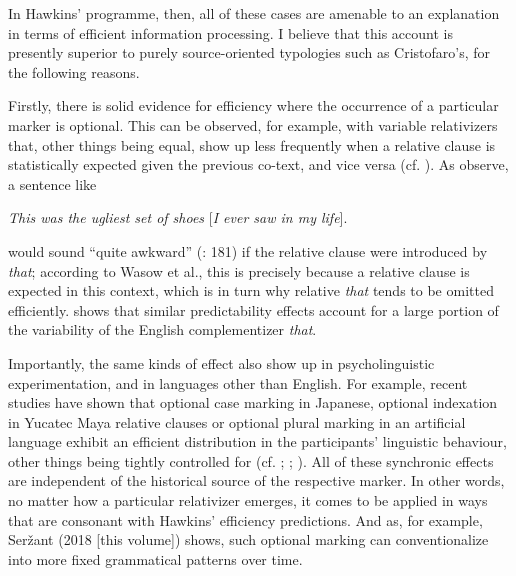 \documentclass[output=paper]{langsci/langscibook}
\begin{document}
In Hawkins’ programme, then, all of these cases are amenable to an explanation in terms of efficient information processing. I believe that this account is presently superior to purely source-oriented typologies such as Cristofaro’s, for the following reasons.

Firstly, there is solid evidence for efficiency where the occurrence of a particular marker is optional. This can be observed, for example, with variable relativizers that, other things being equal, show up less frequently when a relative clause is statistically expected given the previous co-text, and vice versa (cf. \citealt{WasowEtAl2011}). As \citet{FoxThompson2007} observe, a sentence like

\ea
{\textit{This was the ugliest set of shoes} [\textit{I ever saw in my life}].} \\
\z

would sound “quite awkward” (\citealt{WasowEtAl2011}: 181) if the relative clause were introduced by \textit{that}; according to Wasow et al., this is precisely because a relative clause is expected in this context, which is in turn why relative \textit{that} tends to be omitted efficiently. \citet{Jaeger2010} shows that similar predictability effects account for a large portion of the variability of the English complementizer \textit{that}. 

Importantly, the same kinds of effect also show up in psycholinguistic experimentation, and in languages other than English. For example, recent studies have shown that optional case marking in Japanese, optional indexation in Yucatec Maya relative clauses or optional plural marking in an artificial language exhibit an efficient distribution in the participants’ linguistic behaviour, other things being tightly controlled for (cf. \citealt{KurumadaJaeger2015}; \citealt{NorcliffeJaeger2016}; \citealt{KurumadaGrimm2017}). All of these synchronic effects are independent of the historical source of the respective marker. In other words, no matter how a particular relativizer emerges, it comes to be applied in ways that are consonant with Hawkins’ efficiency predictions. And as, for example, Seržant (2018 [this volume]) shows, such optional marking can conventionalize into more fixed grammatical patterns over time.
\end{document}
